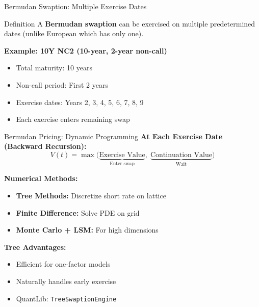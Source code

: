 \documentclass[aspectratio=169,11pt]{beamer}
\begin{document}
\begin{frame}{Bermudan Swaption: Multiple Exercise Dates}
\begin{block}{Definition}
A \textbf{Bermudan swaption} can be exercised on multiple predetermined dates (unlike European which has only one).
\end{block}

\textbf{Example: 10Y NC2 (10-year, 2-year non-call)}
\begin{itemize}
    \item Total maturity: 10 years
    \item Non-call period: First 2 years
    \item Exercise dates: Years 2, 3, 4, 5, 6, 7, 8, 9
    \item Each exercise enters remaining swap
\end{itemize}

\begin{center}
\end{center}
\end{frame}

\begin{frame}{Bermudan Pricing: Dynamic Programming}
\textbf{At Each Exercise Date (Backward Recursion):}
\[
V(t) = \max\Big(\underbrace{\text{Exercise Value}}_{\text{Enter swap}},\; \underbrace{\text{Continuation Value}}_{\text{Wait}}\Big)
\]

\textbf{Numerical Methods:}
\begin{itemize}
    \item \textbf{Tree Methods:} Discretize short rate on lattice
    \item \textbf{Finite Difference:} Solve PDE on grid
    \item \textbf{Monte Carlo + LSM:} For high dimensions
\end{itemize}

\textbf{Tree Advantages:}
\begin{itemize}
    \item Efficient for one-factor models
    \item Naturally handles early exercise
    \item QuantLib: \texttt{TreeSwaptionEngine}
\end{itemize}
\end{frame}
\end{document}
